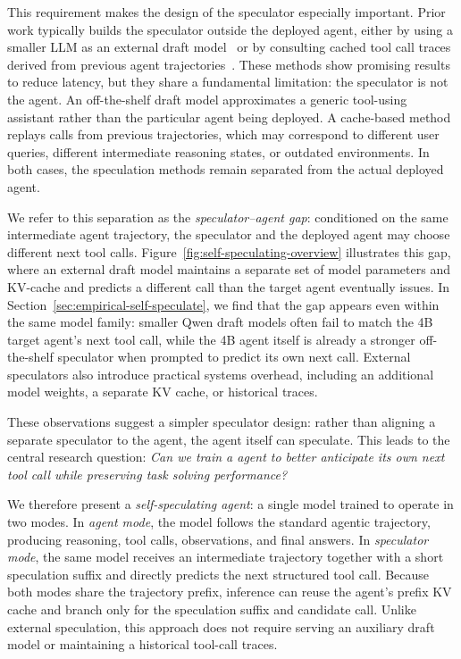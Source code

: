 This requirement makes the design of the speculator especially important. Prior
work typically builds the speculator outside the deployed agent, either by using
a smaller LLM as an external draft model~\citep{ye2026speculativeactions,nichols2025speculativetoolcalls,huang2025spagent}
or by consulting cached tool call traces derived from
previous agent trajectories~\citep{zhong2026dualspec,sui2026paste}. These methods
show promising results to reduce latency, but they share a
fundamental limitation: the speculator is not the agent. An off-the-shelf draft
model approximates a generic tool-using assistant rather than the particular
agent being deployed. A cache-based method replays calls from previous
trajectories, which may correspond to different user queries, different
intermediate reasoning states, or outdated environments. In both cases, the
speculation methods remain separated from the actual deployed agent.

We refer to this separation as the \emph{speculator--agent gap}: conditioned on
the same intermediate agent trajectory, the speculator and the deployed agent may
choose different next tool calls. Figure~\ref{fig:self-speculating-overview}
illustrates this gap, where an external draft model maintains a separate set of model parameters and KV-cache
and predicts a different call than the target agent eventually issues. In
Section~\ref{sec:empirical-self-speculate}, we find that the gap appears even
within the same model family: smaller Qwen draft models often fail to match the
4B target agent's next tool call, while the 4B agent itself is already a stronger off-the-shelf speculator when prompted to predict
its own next call. 
External speculators also introduce practical systems overhead, including an additional
model weights, a separate KV cache, or historical traces.

These observations suggest a simpler speculator design: rather than aligning a separate
speculator to the agent, the agent itself can speculate. This leads to the
central research question: \emph{Can we train a agent to better
anticipate its own next tool call while preserving task solving performance?}

We therefore present a \emph{self-speculating agent}: a single model trained to
operate in two modes. In \emph{agent mode}, the model follows the standard
agentic trajectory, producing reasoning, tool calls, observations, and final
answers. In \emph{speculator mode}, the same model receives an intermediate
trajectory together with a short speculation suffix and directly predicts the
next structured tool call. Because both modes share the trajectory prefix,
inference can reuse the agent's prefix KV cache and branch only for the
speculation suffix and candidate call. Unlike external speculation, this
approach does not require serving an auxiliary draft model or maintaining a
historical tool-call traces.

